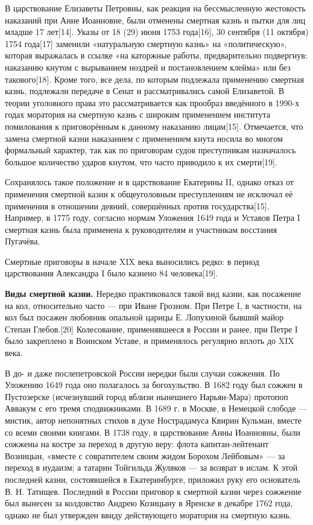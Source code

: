 В царствование Елизаветы Петровны, как реакция на бессмысленную жестокость наказаний при Анне Иоанновне, были отменены смертная казнь и пытки для лиц младше 17 лет[14]. Указы от 18 (29) июня 1753 года[16], 30 сентября (11 октября) 1754 года[17] заменили «натуральную смертную казнь» на «политическую», которая выражалась в ссылке «на каторжные работы, предварительно подвергнув: наказанию кнутом с вырыванием ноздрей и постановлением клейма» или без такового[18]. Кроме того, все дела, по которым подлежала применению смертная казнь, подлежали передаче в Сенат и рассматривались самой Елизаветой. В теории уголовного права это рассматривается как прообраз введённого в 1990-х годах моратория на смертную казнь с широким применением института помилования к приговорённым к данному наказанию лицам[15]. Отмечается, что замена смертной казни наказанием с применением кнута носила во многом формальный характер, так как по приговорам судов преступникам назначалось большое количество ударов кнутом, что часто приводило к их смерти[19].

Сохранялось такое положение и в царствование Екатерины II, однако отказ от применения смертной казни к общеуголовным преступлениям не исключал её применения в отношении деяний, совершённых против государства[15]. Например, в 1775 году, согласно нормам Уложения 1649 года и Уставов Петра I смертная казнь была применена к руководителям и участникам восстания Пугачёва.

Смертные приговоры в начале XIX века выносились редко: в период царствования Александра I было казнено 84 человека[19].

\textbf{Виды смертной казни.} Нередко практиковался такой вид казни, как посажение на кол, относительно часто — при Иване Грозном. При Петре I, в частности, на кол был посажен любовник опальной царицы Е. Лопухиной бывший майор Степан Глебов.[20] Колесование, применявшееся в России и ранее, при Петре I было закреплено в Воинском Уставе, и применялось регулярно вплоть до XIX века.

В до- и даже послепетровской России нередки были случаи сожжения. По Уложению 1649 года оно полагалось за богохульство. В 1682 году был сожжен в Пустозерске (исчезнувший город вблизи нынешнего Нарьян-Мара) протопоп Аввакум с его тремя сподвижниками. В 1689 г. в Москве, в Немецкой слободе — мистик, автор непонятных стихов в духе Нострадамуса Квирин Кульман, вместе со всеми своими книгами. В 1738 году, в царствование Анны Иоанновны, были сожжены на костре за переход в другую веру: флота капитан-лейтенант Возницын, «вместе с совратителем своим жидом Борохом Лейбовым» — за переход в иудаизм; а татарин Тойгильда Жуляков — за возврат в ислам. К этой последней казни, состоявшейся в Екатеринбурге, приложил руку его основатель В. Н. Татищев. Последний в России приговор к смертной казни через сожжение был вынесен за колдовство Андрею Козицыну в Яренске в декабре 1762 года, однако не был утвержден ввиду действующего моратория на смертную казнь.


